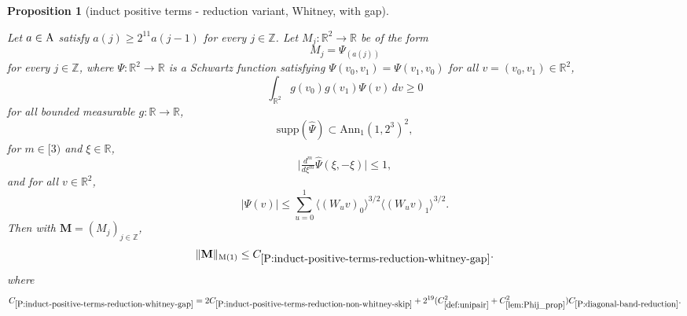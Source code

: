 \documentclass[12pt,reqno]{amsart}
\theoremstyle{plain}
\newtheorem{proposition}[theorem]{Proposition}
\numberwithin{equation}{section}
\theoremstyle{remark}
\newcommand{\uses}[1]{}
\newcommand{\usesdefs}[1]{}
\newcommand{\leanok}{}
\newcommand{\lean}[1]{}
\newcommand{\Z}{{\mathbb Z}}
\newcommand{\R}{{\mathbb R}}
\newcommand{\M}{\mathbf{M}}
\begin{document}
\begin{proposition}[induct positive terms - reduction variant, Whitney, with gap]
\label{P:induct-positive-terms-reduction-whitney-gap}\uses{lem:Phij_prop,lem:form_pos,P:induct-positive-terms-reduction-non-whitney-skip,P:vanishing-diagonal-reduction,lem:smoothdecay2,lem:scaleest,P:diagonal-band-reduction}\usesdefs{bracket bump,normalized function tuples,auto:prism-form-definition,multiplicatively spaced monotone sequences,auto:unitary-matrices-definition,kernel sequences,def:cn-window,def:unipair}
\lean{Auto.inductPositiveTermsReductionWhitneyGap}
\leanok
Let $a\in {\rm A}$ satisfy $a(j)\geq 2^{11}a(j-1)$ for every $j\in\mathbb Z$. Let $M_j:\mathbb{R}^2\to \mathbb{R}$ be of the form
\begin{equation}\label{auto:Whitney-gap-kernel}
M_j=\Psi_{(a(j))}
\end{equation}
for every $j\in\Z$, where $\Psi:\mathbb{R}^2\to \mathbb{R}$ is a Schwartz function satisfying $\Psi(v_0,v_1)=\Psi(v_1,v_0)$ for all $v=(v_0,v_1)\in\mathbb{R}^2$,
\begin{equation}\label{p1-on-W_pos}
\int_{\mathbb{R}^2} g(v_0){g(v_1)}\Psi(v)\,dv\ge 0
\end{equation}
for all bounded measurable $g:\mathbb{R}\to\mathbb{R}$,
\begin{equation}\label{p1-on-W_supp}
\mathrm{supp}(\widehat{\Psi}) \subset \mathrm{Ann}_1(1, 2^3)^2,
\end{equation}
for $m\in [3)$ and $\xi \in \R$,
\begin{equation}\label{p1-on-W_der}
\Big|\tfrac{d^m}{d\xi^{m}} \widehat{\Psi}(\xi,-\xi)\Big| \leq 1,
\end{equation}
and for all $v\in\mathbb{R}^2$,
\begin{equation}\label{p1-on-W_decay}
|\Psi(v)| \le \sum_{u=0}^1 \langle(W_u v)_0\rangle^{3/2} \langle (W_u v)_1\rangle^{3/2}.
\end{equation}
Then with $\M=(M_j)_{j\in\Z}$,
\begin{equation}\label{auto:Whitney-gap-reduction-bound}
\|\M\|_{\rm M(1)} \le C_{\ref{P:induct-positive-terms-reduction-whitney-gap}}.
\end{equation}
where
\begin{equation}\label{auto:Whitney-gap-constant-definition}
C_{\ref{P:induct-positive-terms-reduction-whitney-gap}}
=2C_{\ref{P:induct-positive-terms-reduction-non-whitney-skip}}
+2^{19}(C_{\ref{def:unipair}}^2+C_{\ref{lem:Phij_prop}}^2)C_{\ref{P:diagonal-band-reduction}}.
\end{equation}
\end{proposition}
\end{document}
